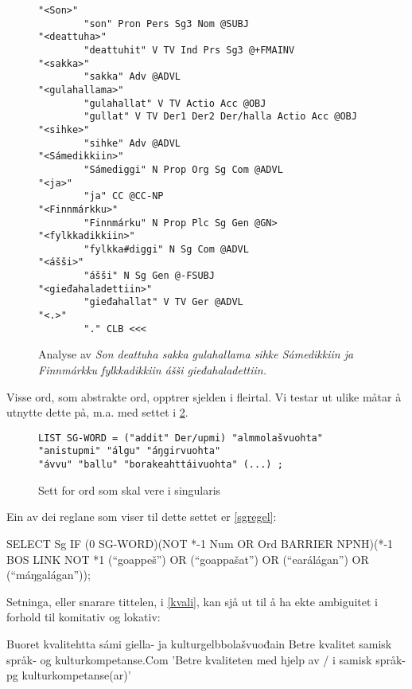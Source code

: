 \documentclass[a4paper,norsk]{article}
\begin{document}
\begin{figure}[htbp]
\begin{center}
\begin{verbatim}
"<Son>"
        "son" Pron Pers Sg3 Nom @SUBJ
"<deattuha>"
        "deattuhit" V TV Ind Prs Sg3 @+FMAINV
"<sakka>"
        "sakka" Adv @ADVL
"<gulahallama>"
        "gulahallat" V TV Actio Acc @OBJ
        "gullat" V TV Der1 Der2 Der/halla Actio Acc @OBJ
"<sihke>"
        "sihke" Adv @ADVL
"<Sámedikkiin>"
        "Sámediggi" N Prop Org Sg Com @ADVL
"<ja>"
        "ja" CC @CC-NP
"<Finnmárkku>"
        "Finnmárku" N Prop Plc Sg Gen @GN>
"<fylkkadikkiin>"
        "fylkka#diggi" N Sg Com @ADVL
"<ášši>"
        "ášši" N Sg Gen @-FSUBJ
"<gieđahaladettiin>"
        "gieđahallat" V TV Ger @ADVL
"<.>"
        "." CLB <<<
\end{verbatim}

\caption{Analyse av \textit{Son deattuha sakka gulahallama sihke Sámedikkiin ja Finnmárkku fylkkadikkiin ášši gieđahaladettiin.}}
\label{fylkeanalyse}
\end{center}
\end{figure}

Visse ord, som abstrakte ord, opptrer sjelden i fleirtal. Vi testar ut ulike måtar å utnytte dette på, m.a. med settet i \ref{sgwds}. %


\begin{figure}[htbp]
\begin{center}
\begin{verbatim}
LIST SG-WORD = ("addit" Der/upmi) "almmolašvuohta" "anistupmi" "álgu" "áŋgirvuohta" 
"ávvu" "ballu" "borakeahttáivuohta" (...) ;
\end{verbatim}
\caption{Sett for ord som skal vere i singularis}
\label{sgwds}
\end{center}
\end{figure}

Ein av dei reglane  som viser til dette settet er \ref{sgregel}: %

\begin{example}\label{sgregel}
SELECT Sg IF (0 SG-WORD)(NOT *-1 Num OR Ord BARRIER NPNH)(*-1 BOS LINK NOT *1 (``goappeš'') OR (``goappašat'') OR (``earálágan'') OR (``máŋgalágan''));
\end{example}

Setninga, eller snarare tittelen, i \ref{kvali}, kan sjå ut til å ha ekte ambiguitet i forhold til komitativ og lokativ: %

\begin{example}\label{kvali}
\gll Buoret kvalitehtta sámi giella- ja kulturgelbbolašvuođain
      Betre kvalitet samisk språk- og kulturkompetanse.Com
\glt 'Betre kvaliteten med hjelp av / i samisk språk- pg kulturkompetanse(ar)'
\glend
\end{example}
\end{document}
